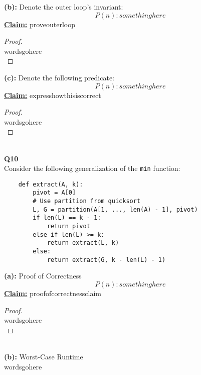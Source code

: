 \documentclass[12pt]{article}
\begin{document}
\textbf{(b):} Denote the outer loop's invariant:
\[P(n): somethinghere\]
\textbf{\underline{Claim:}} proveouterloop
\begin{proof}
\leavevmode\\
    wordsgohere \\
\end{proof}
\leavevmode
\textbf{(c):} Denote the following predicate:
\[P(n): somethinghere\]
\textbf{\underline{Claim:}} expresshowthisiscorrect
\begin{proof}
\leavevmode\\
    wordsgohere \\
\end{proof}
\leavevmode\\
\textbf{Q10} \\
Consider the following generalization of the \texttt{min} function:
\begin{lstlisting}
    def extract(A, k):
        pivot = A[0]
        # Use partition from quicksort
        L, G = partition(A[1, ..., len(A) - 1], pivot)
        if len(L) == k - 1:
            return pivot
        else if len(L) >= k:
            return extract(L, k)
        else:
            return extract(G, k - len(L) - 1)
\end{lstlisting}
\textbf{(a):} Proof of Correctness \\
\[P(n): somethinghere\]
\textbf{\underline{Claim:}} proofofcorrectnessclaim
\begin{proof}
\leavevmode\\
    wordsgohere \\
\end{proof}
\leavevmode\\
\textbf{(b):} Worst-Case Runtime \\
wordsgohere \\
\\
\pagebreak
\end{document}
